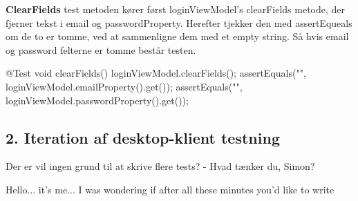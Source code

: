 \textbf{ClearFields} test metoden kører først loginViewModel’s clearFields metode, der fjerner tekst i email og passwordProperty. Herefter tjekker den med assertEqueals om de to er tomme, ved at sammenligne dem med et empty string. Så hvis email og password felterne er tomme består testen.\\

\begin{code}[caption=LoginViewModel.java, firstnumber=49]
@Test
void clearFields() {
    loginViewModel.clearFields();
    assertEquals("", loginViewModel.emailProperty().get());
    assertEquals("", loginViewModel.passwordProperty().get());
}
\end{code}

\subsection{2. Iteration af desktop-klient testning}
Der er vil ingen grund til at skrive flere tests?
- Hvad tænker du, Simon?

Hello... it's me... I was wondering if after all these minutes you'd like to write 